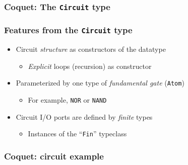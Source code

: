         \begin{frame}
            \frametitle{Coquet: The \texttt{Circuit} type}
        \end{frame}
        
        \begin{frame}
            \frametitle{Features from the \texttt{Circuit} type}

            \begin{itemize}
                \item Circuit \emph{structure} as constructors of the datatype
                    \begin{itemize}
                        \item \emph{Explicit} loops (recursion) as constructor
                    \end{itemize}
                \item Parameterized by one type of \emph{fundamental gate} (\texttt{Atom})
                    \begin{itemize}
                        \item For example, \texttt{NOR} or \texttt{NAND}
                    \end{itemize}
                \item Circuit I/O ports are defined by \emph{finite} types
                    \begin{itemize}
                        \item Instances of the ``\texttt{Fin}'' typeclass
                    \end{itemize}
            \end{itemize}
        \end{frame}

        \begin{frame}
            \frametitle{Coquet: circuit example}
        \end{frame}

